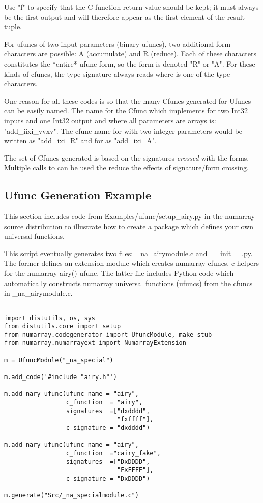 Use "f" to specify that the C function return value should be kept; it must
always be the first output and will therefore appear as the first element of
the result tuple.

For ufuncs of two input parameters (binary ufuncs), two additional form
characters are possible: A (accumulate) and R (reduce).  Each of these
characters constitutes the *entire* ufunc form, so the form is denoted "R" or
"A".  For these kinds of cfuncs, the type signature always reads 
where  is one of the type characters.  

One reason for all these codes is so that the many Cfuncs generated for Ufuncs
can be easily named.  The name for the Cfunc which implements 
for two Int32 inputs and one Int32 output and where all parameters are arrays
is: "add_iixi_vvxv".  The cfunc name for  with two integer
parameters would be written as "add_ixi_R" and for 
as "add_ixi_A".

The set of Cfuncs generated is based on the signatures \emph{crossed} with the
forms.  Multiple calls to  can be used the reduce the
effects of signature/form crossing.

\newpage
\subsection{Ufunc Generation Example}

This section includes code from Examples/ufunc/setup_airy.py in the numarray
source distribution to illustrate how to create a package which defines your
own universal functions.  

This script eventually generates two files: _na_airymodule.c and
__init__.py.  The former defines an extension module which creates
numarray cfuncs, c helpers for the numarray airy() ufunc.  The latter
file includes Python code which automatically constructs numarray
universal functions (ufuncs) from the cfuncs in _na_airymodule.c.

\begin{verbatim}

import distutils, os, sys
from distutils.core import setup
from numarray.codegenerator import UfuncModule, make_stub
from numarray.numarrayext import NumarrayExtension

m = UfuncModule("_na_special")

m.add_code('#include "airy.h"')

m.add_nary_ufunc(ufunc_name = "airy",
                 c_function  = "airy",    
                 signatures  =["dxdddd",
                               "fxffff"],
                 c_signature = "dxdddd")

m.add_nary_ufunc(ufunc_name = "airy",
                 c_function  ="cairy_fake",
                 signatures  =["DxDDDD",
                               "FxFFFF"],
                 c_signature = "DxDDDD")

m.generate("Src/_na_specialmodule.c")

\end{verbatim}

